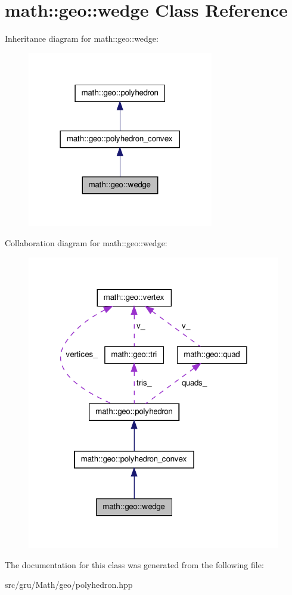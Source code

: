 \hypertarget{classmath_1_1geo_1_1wedge}{\section{math\-:\-:geo\-:\-:wedge \-Class \-Reference}
\label{classmath_1_1geo_1_1wedge}
}


\-Inheritance diagram for math\-:\-:geo\-:\-:wedge\-:
\nopagebreak
\begin{figure}[H]
\begin{center}
\leavevmode
\includegraphics[width=230pt]{classmath_1_1geo_1_1wedge__inherit__graph}
\end{center}
\end{figure}


\-Collaboration diagram for math\-:\-:geo\-:\-:wedge\-:
\nopagebreak
\begin{figure}[H]
\begin{center}
\leavevmode
\includegraphics[width=314pt]{classmath_1_1geo_1_1wedge__coll__graph}
\end{center}
\end{figure}


\-The documentation for this class was generated from the following file\-:\begin{DoxyCompactItemize}
\item 
src/gru/\-Math/geo/polyhedron.\-hpp\end{DoxyCompactItemize}
